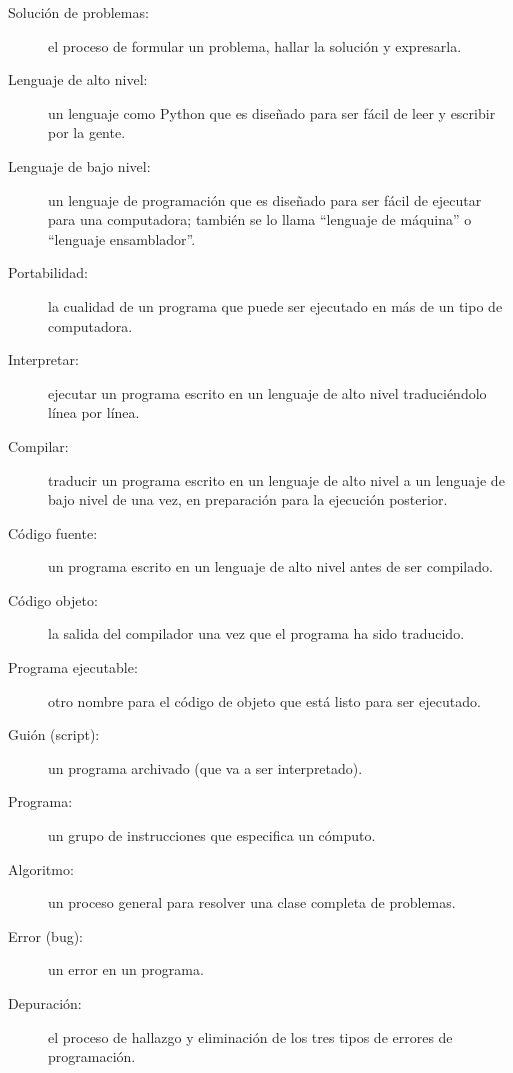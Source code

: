 \begin{description}

\item[Solución de problemas:]  el proceso de formular un problema,
hallar la solución y expresarla.

\item[Lenguaje de alto nivel:]  un lenguaje como Python que es diseñado
para ser fácil de leer y escribir por la gente.

\item[Lenguaje de bajo nivel:]  un lenguaje de programación que es
diseñado para ser fácil de ejecutar para una computadora; también
se lo llama ``lenguaje de máquina'' o ``lenguaje ensamblador''.

\item[Portabilidad:]  la cualidad de un programa que puede ser 
ejecutado
en más de un tipo de computadora.

\item[Interpretar:]  ejecutar un programa escrito en un lenguaje de
alto nivel traduciéndolo línea por línea.

\item[Compilar:]  traducir un programa escrito en un lenguaje
de alto nivel a un lenguaje de bajo nivel de una vez,
en preparación para la ejecución posterior.

\item[Código fuente:]  un programa escrito en un lenguaje de alto
nivel antes de ser compilado.

\item[Código objeto:]  la salida del compilador una vez que
el programa ha sido traducido.

\item[Programa ejecutable:]  otro nombre para el código de objeto
que está listo para ser ejecutado.

\item[Guión (script):] un programa archivado (que va a ser interpretado).

\item[Programa:] un grupo de instrucciones que especifica un cómputo.

\item[Algoritmo:]  un proceso general para resolver una
clase completa de problemas.

\item[Error (bug):]  un error en un programa.

\item[Depuración:]  el proceso de hallazgo y eliminación de los
tres tipos de errores de programación.


\end{description}
